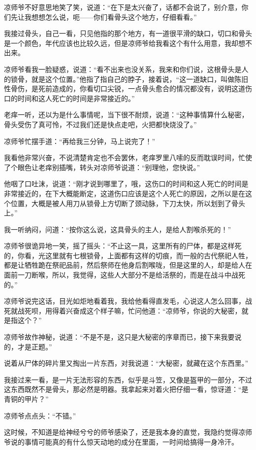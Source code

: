 凉师爷不好意思地笑了笑，说道：“在下是太兴奋了，话都不会说了，别介意，你们先让我想想怎么说，呃——你们看骨头这个地方，仔细看看。”

我接过骨头，自己一看，只见他指的那个地方，有一道很平滑的缺口，切口和骨头是一个颜色，年代应该也比较久远，但是凉师爷给我看这个有什么用意，我却想不出来。

凉师爷看我一脸疑惑，说道：“看不出来也没关系，我来和你们说，这根骨头是人的锁骨，就是这个位置。”他指了指自己的脖子，接着说，“这一道缺口，叫做陈旧性骨伤，是死前造成的，你看切口尖锐，一点骨头愈合的情况都没有，说明这道伤口的时间和这人死亡的时间是非常接近的。”

老痒一听，还以为是什么事情呢，当下很不耐烦，说道：“这种事情算什么秘密，骨头受伤了真可怜，不过我们还是快点走吧，火把都快烧没了。”

凉师爷忙摆手道：“再给我三分钟，马上说完了！”

我看他非常兴奋，不说清楚肯定也不会罢休，老痒罗里八嗦的反而耽误时间，忙使了个眼色让老痒别插嘴，转头对凉师爷说道：“别理他，您快说。”

他咽了口吐沫，说道：“刚才说到哪里了，哦，这伤口的时间和这人死亡的时间是非常接近的，在下大概能断定，这道伤口应该是这个人死亡的原因，之所以是在这个位置，大概是被人用刀从锁骨上方切断了颈动脉，下刀太快，所以划到了骨头上。”

我一听纳闷，问道：“按你这么说，这具骨头的主人，是给人割喉杀死的！”

凉师爷很诡异地一笑，摇了摇头：“不止这一具，这里所有的尸体，都是这样死的，你看，光这里就有七根锁骨，上面都有这样的切痕，而一般的古代祭祀人牲，都是让牺牲跪在祭祀品前，然后祭师在他身后割喉咙，但是这里的人，却是给人在面前一刀断喉，所以，我觉得，这些人大部分不是给活祭的，而是在战斗中战死的。”

凉师爷说完这话，目光如炬地看着我，我给他看得直发毛，心说这人怎么回事，战死就战死呗，用得着兴奋成这个样子嘛，忙问他道：“凉师爷，你说的大秘密，就是指这个？”

凉师爷故作神秘，说道：“不是不是，这只是大秘密的序章而已，接下来我要说的，才是正题。”

说着从尸体的碎片里又掏出一片东西，对我说道：“大秘密，就藏在这个东西里。”

我接过来一看，是一片无法形容的东西，似乎是斗笠，又像是盔甲的一部分，不过这东西既然不是骨头，那必然是明器。我拿起来对着火把仔细一看，惊讶道：“是青铜的甲片？”

凉师爷点点头：“不错。”

这时候，不知道是给神经兮兮的师爷感染了，还是我本身的直觉，我隐约觉得凉师爷说的事情可能真的有什么惊天动地的成分在里面，一时间给搞得一身冷汗。


